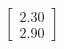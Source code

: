 \documentclass[preview]{standalone}
\begin{document}
\begin{align*}
\begin{bmatrix} 2.30 \\ 2.90 \end{bmatrix}
\end{align*}
\end{document}

